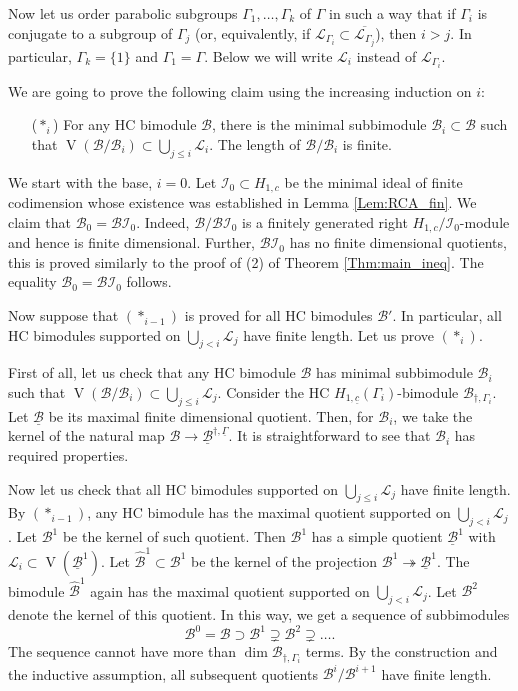 \documentclass[12pt]{amsart}
\newcommand{\I}{\mathcal{I}}
\newcommand{\VA}{\operatorname{V}}
\newcommand{\B}{\mathcal{B}}
\theoremstyle{definition}
\begin{document}
Now let us order parabolic subgroups $\Gamma_1,\ldots,\Gamma_k$ of $\Gamma$
in such a way that if $\Gamma_i$ is conjugate to a subgroup of $\Gamma_j$
(or, equivalently, if $\mathcal{L}_{\Gamma_i}\subset \overline{\mathcal{L}_{\Gamma_j}}$),
then $i>j$. In particular, $\Gamma_k=\{1\}$ and $\Gamma_1=\Gamma$. Below we will write
$\mathcal{L}_i$ instead of $\mathcal{L}_{\Gamma_i}$.

We are going to prove the following claim using the increasing induction on $i$:
\begin{itemize}
\item[($*_i$)] For any HC bimodule $\B$, there is the minimal subbimodule $\B_i\subset \B$ such that
$\VA(\B/\B_i)\subset \bigcup_{j\leqslant i}\mathcal{L}_i$. The length
of $\B/\B_i$ is finite.
\end{itemize}

We start with the base, $i=0$. Let $\I_0\subset H_{1,c}$ be the minimal ideal of finite codimension
whose existence was established in Lemma \ref{Lem:RCA_fin}. We claim that $\B_0=\B\I_0$.
Indeed, $\B/\B\I_0$ is a finitely generated right $H_{1,c}/\I_0$-module and hence is
finite dimensional.  Further, $\B\I_0$ has no finite dimensional quotients, this is proved similarly to the
proof of (2) of Theorem \ref{Thm:main_ineq}. The equality $\B_0=\B\I_0$ follows.

Now suppose that $(*_{i-1})$ is proved for all HC bimodules $\B'$. In particular,
all HC bimodules supported on $\bigcup_{j<i}\mathcal{L}_{j}$ have finite length.
Let us prove $(*_i)$.

First of all, let us check that any HC bimodule $\B$ has minimal
subbimodule $\B_i$ such  that $\VA(\B/\B_i)\subset \bigcup_{j\leqslant i}\mathcal{L}_j$.
Consider the HC $H_{1,\underline{c}}(\Gamma_i)$-bimodule $\B_{\dagger,\Gamma_i}$. Let
$\underline{\B}$ be its maximal finite dimensional quotient. Then, for $\B_i$,
we take the kernel of the natural map $\B\rightarrow \underline{\B}^{\dagger,\underline{\Gamma}}$.
It is straightforward to see that $\B_i$ has required properties.

Now let us check that all HC bimodules supported on $\bigcup_{j\leqslant i}\mathcal{L}_{j}$
have finite length. By $(*_{i-1})$, any HC bimodule has the maximal quotient supported
on $\bigcup_{j<i}\mathcal{L}_{j}$. Let $\B^1$  be the kernel of such quotient. Then $\B^1$
has a simple quotient $\underline{\B}^1$ with $\mathcal{L}_{i}\subset \VA(\underline{\B}^1)$.
Let $\hat{\B}^1\subset \B^1$ be the kernel of the projection $\B^1\twoheadrightarrow \underline{\B}^1$.
The bimodule $\hat{\B}^1$ again has the maximal quotient supported on
$\bigcup_{j<i}\mathcal{L}_{j}$. Let $\B^2$ denote the kernel of this quotient.
In this way, we get a sequence of subbimodules
$$\B^0=\B\supset \B^1\supsetneq \B^2\supsetneq\ldots.$$
The sequence cannot have more than $\dim \B_{\dagger,\Gamma_i}$ terms. By the construction
and the inductive assumption, all subsequent quotients $\B^i/\B^{i+1}$ have finite length.
\end{document}
